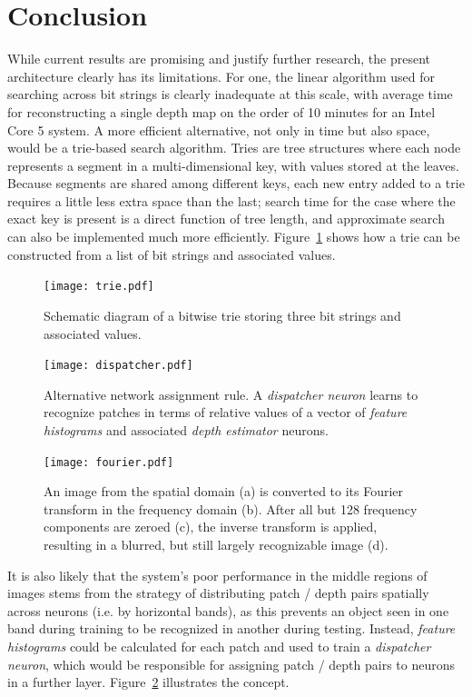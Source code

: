 \documentclass[twocolumn, 9pt]{jsproceedings}
\begin{document}
\section{Conclusion}

While current results are promising and justify further research, the present architecture clearly has its limitations. For one, the linear algorithm used for searching across bit strings is clearly inadequate at this scale, with average time for reconstructing a single depth map on the order of 10 minutes for an Intel Core 5 system. A more efficient alternative, not only in time but also space, would be a trie-based search algorithm. Tries are tree structures where each node represents a segment in a multi-dimensional key, with values stored at the leaves. Because segments are shared among different keys, each new entry added to a trie requires a little less extra space than the last; search time for the case where the exact key is present is a direct function of tree length, and approximate search can also be implemented much more efficiently. Figure~\ref{fig:trie} shows how a trie can be constructed from a list of bit strings and associated values.

\begin{figure}[h!]
\texttt{[image: trie.pdf]}
\caption{Schematic diagram of a bitwise trie storing three bit strings and associated values.}
\label{fig:trie}
\end{figure}

\begin{figure}[h!]
\texttt{[image: dispatcher.pdf]}
\caption{Alternative network assignment rule. A {\it dispatcher neuron} learns to recognize patches in terms of relative values of a vector of {\it feature histograms} and associated {\it depth estimator} neurons.}
\label{fig:dispatcher}
\end{figure}

\begin{figure}[h!]
\texttt{[image: fourier.pdf]}
\caption{An image from the spatial domain (a) is converted to its Fourier transform in the frequency domain (b). After all but 128 frequency components are zeroed (c), the inverse transform is applied, resulting in a blurred, but still largely recognizable image (d).}
\label{fig:fourier}
\end{figure}

It is also likely that the system's poor performance in the middle regions of images stems from the strategy of distributing patch / depth pairs spatially across neurons (i.e. by horizontal bands), as this prevents an object seen in one band during training to be recognized in another during testing. Instead, {\it feature histograms} could be calculated for each patch and used to train a {\it dispatcher neuron}, which would be responsible for assigning patch / depth pairs to neurons in a further layer. Figure~\ref{fig:dispatcher} illustrates the concept.
\end{document}
